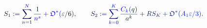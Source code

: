 \documentclass[12pt]{article}
\begin{document}
\makeatletter
\renewcommand*{\@textcolor}[3]{%
  \protect\leavevmode
  \begingroup
    \color#1{#2}#3%
  \endgroup
}
\makeatother
\begin{displaymath}
\mathcolor[RGB]{0,0,15}{S} _ { \mathcolor[RGB]{0,0,30}{1} } \mathcolor[RGB]{0,0,45}{:} \mathcolor[RGB]{0,0,60}{=} \mathcolor[RGB]{0,0,75}{\sum} _ { \mathcolor[RGB]{0,0,90}{n} \mathcolor[RGB]{0,0,105}{=} \mathcolor[RGB]{0,0,120}{1} } ^ { \mathcolor[RGB]{0,0,135}{N} } \mathcolor[RGB]{0,0,150}{\frac { \mathcolor[RGB]{0,0,165}{1} } { \mathcolor[RGB]{0,0,180}{n} ^ { \mathcolor[RGB]{0,0,195}{s} } } } \mathcolor[RGB]{0,0,210}{+} \mathfrak { \mathcolor[RGB]{0,0,225}{O} } ^ { \mathcolor[RGB]{0,0,240}{*} } \mathcolor[RGB]{0,0,255}{(} \mathcolor[RGB]{0,15,0}{\varepsilon} \mathcolor[RGB]{0,15,15}{/} \mathcolor[RGB]{0,15,30}{6} \mathcolor[RGB]{0,15,45}{)} \mathcolor[RGB]{0,15,60}{,} \qquad \mathcolor[RGB]{0,15,75}{S} _ { \mathcolor[RGB]{0,15,90}{2} } \mathcolor[RGB]{0,15,105}{:} \mathcolor[RGB]{0,15,120}{=} \mathcolor[RGB]{0,15,135}{\sum} _ { \mathcolor[RGB]{0,15,150}{k} \mathcolor[RGB]{0,15,165}{=} \mathcolor[RGB]{0,15,180}{0} } ^ { \mathcolor[RGB]{0,15,195}{K} } \mathcolor[RGB]{0,15,210}{\frac { \mathcolor[RGB]{0,15,225}{C} _ { \mathcolor[RGB]{0,15,240}{k} } \mathcolor[RGB]{0,15,255}{(} \mathcolor[RGB]{0,30,0}{q} \mathcolor[RGB]{0,30,15}{)} } { \mathcolor[RGB]{0,30,30}{a} ^ { \mathcolor[RGB]{0,30,45}{k} } } } \mathcolor[RGB]{0,30,60}{+} \mathcolor[RGB]{0,30,75}{R} \mathcolor[RGB]{0,30,90}{S} _ { \mathcolor[RGB]{0,30,105}{K} } \mathcolor[RGB]{0,30,120}{+} \mathfrak { \mathcolor[RGB]{0,30,135}{O} } ^ { \mathcolor[RGB]{0,30,150}{*} } \mathcolor[RGB]{0,30,165}{(} \mathcolor[RGB]{0,30,180}{A} _ { \mathcolor[RGB]{0,30,195}{1} } \mathcolor[RGB]{0,30,210}{\varepsilon} \mathcolor[RGB]{0,30,225}{/} \mathcolor[RGB]{0,30,240}{3} \mathcolor[RGB]{0,30,255}{)} \mathcolor[RGB]{0,45,0}{.}
\end{displaymath}
\end{document}

